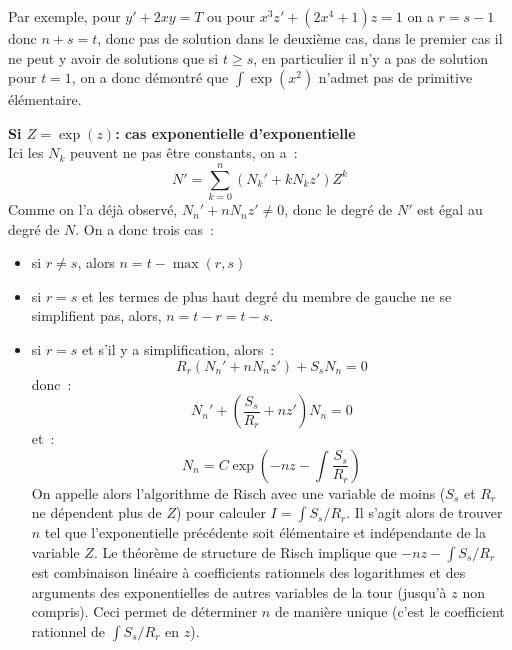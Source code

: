 \documentclass[a4paper,11pt]{article}
\begin{document}
Par exemple, pour $y'+2xy=T$ ou pour $x^3z'+(2x^4+1)z=1$ on a $r=s-1$ donc
$n+s=t$, donc pas de solution dans le deuxième cas, dans le premier cas
il ne peut y avoir de solutions que si $t \geq s$, en particulier
il n'y a pas de solution pour $t=1$, on a donc démontré que $\int \exp(x^2)$
n'admet pas de primitive élémentaire.

{\bf Si $Z=\exp(z)$: cas exponentielle d'exponentielle}\\
Ici les $N_k$ peuvent ne pas être constants, on a~:
\[ N'=\sum_{k=0}^n (N_k'+kN_k z') Z^k\]
Comme on l'a déjà observé, $N_n'+n N_n z'\neq 0$, donc le
degré de $N'$ est égal au degré de $N$. On a donc trois cas~:
\begin{itemize} 
\item si $r\neq s$, alors $n=t-\max(r,s)$
\item si $r=s$ et les termes de plus haut degré du membre de gauche ne
se simplifient pas, alors, $n=t-r=t-s$.
\item si $r=s$ et s'il y a simplification, alors~:
\[ R_r(N_n'+nN_nz')+S_sN_n=0 \]
donc~:
\[ N_n' + (\frac{S_s}{R_r}+nz')N_n = 0\]
et~:
\[ N_n = C \exp(-nz-\int \frac{S_s}{R_r}) \]
On appelle alors l'algorithme de Risch avec une variable de moins ($S_s$
et $R_r$ ne dépendent plus de $Z$) pour calculer $I=\int S_s/R_r$. 
Il s'agit alors de trouver $n$ tel que l'exponentielle précédente
soit élémentaire et indépendante de la variable $Z$. Le théorème
de structure de Risch implique que $-nz-\int S_s/R_r$ est combinaison 
linéaire à coefficients rationnels des logarithmes et des arguments 
des exponentielles de autres variables de la tour (jusqu'à $z$ non compris).
Ceci permet de déterminer $n$ de manière unique (c'est le coefficient
rationnel de $\int S_s/R_r$ en $z$).
\end{itemize}
\end{document}
